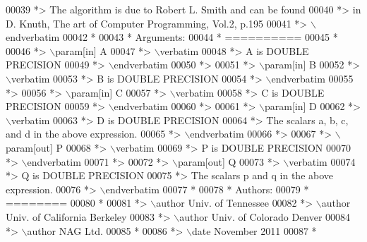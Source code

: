 \begin{DoxyCode}
00039 \textcolor{comment}{*> The algorithm is due to Robert L. Smith and can be found}
00040 \textcolor{comment}{*> in D. Knuth, The art of Computer Programming, Vol.2, p.195}
00041 \textcolor{comment}{*> \(\backslash\)endverbatim}
00042 \textcolor{comment}{*}
00043 \textcolor{comment}{*  Arguments:}
00044 \textcolor{comment}{*  ==========}
00045 \textcolor{comment}{*}
00046 \textcolor{comment}{*> \(\backslash\)param[in] A}
00047 \textcolor{comment}{*> \(\backslash\)verbatim}
00048 \textcolor{comment}{*>          A is DOUBLE PRECISION}
00049 \textcolor{comment}{*> \(\backslash\)endverbatim}
00050 \textcolor{comment}{*>}
00051 \textcolor{comment}{*> \(\backslash\)param[in] B}
00052 \textcolor{comment}{*> \(\backslash\)verbatim}
00053 \textcolor{comment}{*>          B is DOUBLE PRECISION}
00054 \textcolor{comment}{*> \(\backslash\)endverbatim}
00055 \textcolor{comment}{*>}
00056 \textcolor{comment}{*> \(\backslash\)param[in] C}
00057 \textcolor{comment}{*> \(\backslash\)verbatim}
00058 \textcolor{comment}{*>          C is DOUBLE PRECISION}
00059 \textcolor{comment}{*> \(\backslash\)endverbatim}
00060 \textcolor{comment}{*>}
00061 \textcolor{comment}{*> \(\backslash\)param[in] D}
00062 \textcolor{comment}{*> \(\backslash\)verbatim}
00063 \textcolor{comment}{*>          D is DOUBLE PRECISION}
00064 \textcolor{comment}{*>          The scalars a, b, c, and d in the above expression.}
00065 \textcolor{comment}{*> \(\backslash\)endverbatim}
00066 \textcolor{comment}{*>}
00067 \textcolor{comment}{*> \(\backslash\)param[out] P}
00068 \textcolor{comment}{*> \(\backslash\)verbatim}
00069 \textcolor{comment}{*>          P is DOUBLE PRECISION}
00070 \textcolor{comment}{*> \(\backslash\)endverbatim}
00071 \textcolor{comment}{*>}
00072 \textcolor{comment}{*> \(\backslash\)param[out] Q}
00073 \textcolor{comment}{*> \(\backslash\)verbatim}
00074 \textcolor{comment}{*>          Q is DOUBLE PRECISION}
00075 \textcolor{comment}{*>          The scalars p and q in the above expression.}
00076 \textcolor{comment}{*> \(\backslash\)endverbatim}
00077 \textcolor{comment}{*}
00078 \textcolor{comment}{*  Authors:}
00079 \textcolor{comment}{*  ========}
00080 \textcolor{comment}{*}
00081 \textcolor{comment}{*> \(\backslash\)author Univ. of Tennessee }
00082 \textcolor{comment}{*> \(\backslash\)author Univ. of California Berkeley }
00083 \textcolor{comment}{*> \(\backslash\)author Univ. of Colorado Denver }
00084 \textcolor{comment}{*> \(\backslash\)author NAG Ltd. }
00085 \textcolor{comment}{*}
00086 \textcolor{comment}{*> \(\backslash\)date November 2011}
00087 \textcolor{comment}{*}

\end{DoxyCode}
